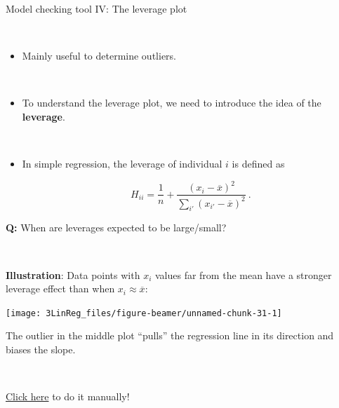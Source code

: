 \documentclass[10pt,ignorenonframetext,]{beamer}
\providecommand{\tightlist}{%
  \setlength{\itemsep}{0pt}\setlength{\parskip}{0pt}}
\begin{document}
\begin{frame}

\begin{block}{Model checking tool IV: The leverage plot}

\(~\)

\begin{itemize}
\tightlist
\item
  Mainly useful to determine outliers.
\end{itemize}

\(~\)

\begin{itemize}
\tightlist
\item
  To understand the leverage plot, we need to introduce the idea of the
  \textbf{leverage}.
\end{itemize}

\(~\)

\begin{itemize}
\tightlist
\item
  In simple regression, the leverage of individual \(i\) is defined as

  \begin{equation}\label{eq:leverage}
  H_{ii} = \frac{1}{n} + \frac{(x_i-\overline{x})^2}{\sum_{i'}(x_{i'}-\overline{x})^2} \ . 
  \end{equation}
\end{itemize}

\vspace{7mm}

\textbf{Q:} When are leverages expected to be large/small?

\(~\)

\end{block}

\end{frame}

\begin{frame}

\textbf{Illustration}: Data points with \(x_i\) values far from the mean
have a stronger leverage effect than when \(x_i\approx \overline{x}\):

\begin{center}\texttt{[image: 3LinReg\_files/figure-beamer/unnamed-chunk-31-1]} \end{center}

The outlier in the middle plot ``pulls'' the regression line in its
direction and biases the slope.

\(~\)

\href{http://students.brown.edu/seeing-theory/regression-analysis/index.html}{Click here}
to do it manually!

\end{frame}
\end{document}
